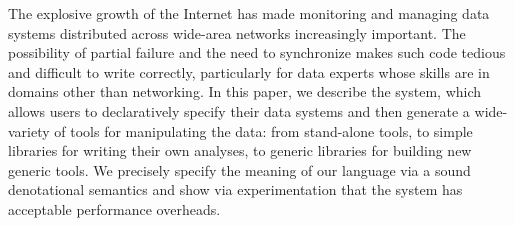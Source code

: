 The explosive growth of the Internet has made monitoring and managing
data systems distributed across wide-area networks increasingly
important.  The possibility of partial failure and the need to
synchronize makes such code tedious and difficult to write correctly,
particularly for data experts whose skills are in domains other than
networking. In this paper, we describe the \padsd{} system, which
allows users to declaratively specify their data systems and then
generate a wide-variety of tools for manipulating the data: from
stand-alone tools, to simple libraries for writing their own analyses,
to generic libraries for building new generic tools.  We precisely
specify the meaning of our language via a sound denotational
semantics and show via experimentation that the system has
acceptable performance overheads.
